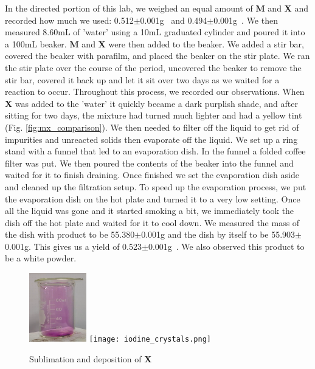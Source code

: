 \documentclass[titlepage]{article}
\begin{document}
In the directed portion of this lab, we weighed an equal amount of \textbf{M} and \textbf{X} and recorded how much we used: 0.512$\pm$0.001\unit{\gram{}} and 0.494$\pm$0.001\unit{\gram{}}. We then measured 8.60\unit{\milli\liter} of 'water' using a 10\unit{\milli\liter} graduated cylinder and poured it into a 100\unit{\milli\liter} beaker. \textbf{M} and \textbf{X} were then added to the beaker. We added a stir bar, covered the beaker with parafilm, and placed the beaker on the stir plate. We ran the stir plate over the course of the period, uncovered the beaker to remove the stir bar, covered it back up and let it sit over two days as we waited for a reaction to occur. Throughout this process, we recorded our observations. When \textbf{X} was added to the 'water' it quickly became a dark purplish shade, and after sitting for two days, the mixture had turned much lighter and had a yellow tint (Fig. \ref{fig:mx_comparison}). We then needed to filter off the liquid to get rid of impurities and unreacted solids then evaporate off the liquid. We set up a ring stand with a funnel that led to an evaporation dish. In the funnel a folded coffee filter was put. We then poured the contents of the beaker into the funnel and waited for it to finish draining. Once finished we set the evaporation dish aside and cleaned up the filtration setup. To speed up the evaporation process, we put the evaporation dish on the hot plate and turned it to a very low setting. Once all the liquid was gone and it started smoking a bit, we immediately took the dish off the hot plate and waited for it to cool down. We measured the mass of the dish with product to be 55.380$\pm$0.001\unit{\gram} and the dish by itself to be 55.903$\pm$0.001\unit{\gram}. This gives us a yield of 0.523$\pm$0.001\unit{\gram{}}. We also observed this product to be a white powder.

\begin{figure}[h]
    \centering
    \includegraphics[height=3cm]{iodine_gas.png}
    \texttt{[image: iodine\_crystals.png]} 
    \caption{Sublimation and deposition of \textbf{X}}
    \label{fig:heated_x}
\end{figure}
\end{document}
